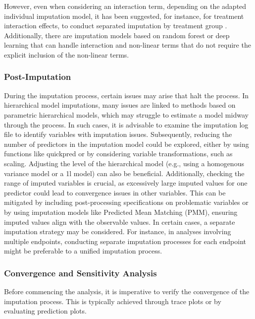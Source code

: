 \documentclass[
]{jss}
\begin{document}
However, even when considering an interaction term, depending on the
adapted individual imputation model, it has been suggested, for
instance, for treatment interaction effects, to conduct separated
imputation by treatment group \cite{Zhang_2023}. Additionally, there are
imputation models based on random forest or deep learning that can
handle interaction and non-linear terms that do not require the explicit
inclusion of the non-linear terms.

\hypertarget{post-imputation}{%
\subsubsection{Post-Imputation}\label{post-imputation}}

During the imputation process, certain issues may arise that halt the
process. In hierarchical model imputations, many issues are linked to
methods based on parametric hierarchical models, which may struggle to
estimate a model midway through the process. In such cases, it is
advisable to examine the imputation log file to identify variables with
imputation issues. Subsequently, reducing the number of predictors in
the imputation model could be explored, either by using functions like
quickpred or by considering variable transformations, such as scaling.
Adjusting the level of the hierarchical model (e.g., using a homogenous
variance model or a 1l model) can also be beneficial. Additionally,
checking the range of imputed variables is crucial, as excessively large
imputed values for one predictor could lead to convergence issues in
other variables. This can be mitigated by including post-processing
specifications on problematic variables or by using imputation models
like Predicted Mean Matching (PMM), ensuring imputed values align with
the observable values. In certain cases, a separate imputation strategy
may be considered. For instance, in analyses involving multiple
endpoints, conducting separate imputation processes for each endpoint
might be preferable to a unified imputation process.

\hypertarget{convergence-and-sensitivity-analysis}{%
\subsubsection{Convergence and Sensitivity
Analysis}\label{convergence-and-sensitivity-analysis}}

Before commencing the analysis, it is imperative to verify the
convergence of the imputation process. This is typically achieved
through trace plots or by evaluating prediction plots.
\end{document}
